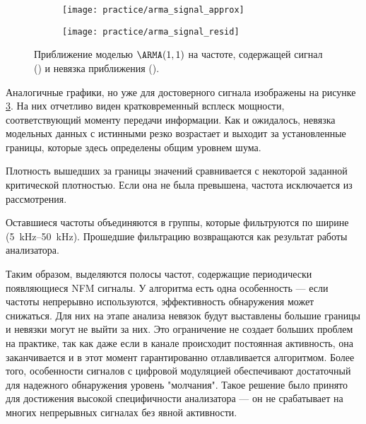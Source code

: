\begin{figure}[h]
  \centering
  \begin{subfigure}{0.45\textwidth}
    \texttt{[image: practice/arma\_signal\_approx]}
    \caption{}
    \label{fig:practice:arma_signal_approx}
  \end{subfigure}
  \begin{subfigure}{0.45\textwidth}
    \texttt{[image: practice/arma\_signal\_resid]}
    \caption{}
    \label{fig:practice:arma_signal_resid}
  \end{subfigure}
  \caption{Приближение моделью $\ARMA(1,1)$ на частоте, содержащей сигнал () и невязка приближения ().}
  \label{fig:practice:arma_signal}
\end{figure}

Аналогичные графики, но уже для достоверного сигнала изображены на рисунке \ref{fig:practice:arma_signal}. На них отчетливо виден кратковременный всплеск мощности, соответствующий моменту передачи информации. Как и ожидалось, невязка модельных данных с истинными резко возрастает и выходит за установленные границы, которые здесь определены общим уровнем шума.

Плотность вышедших за границы значений сравнивается с некоторой заданной критической плотностью. Если она не была превышена, частота исключается из рассмотрения.

Оставшиеся частоты объединяются в группы, которые фильтруются по ширине (\SIrange{5}{50}{\kilo\hertz}). Прошедшие фильтрацию возвращаются как результат работы анализатора.

Таким образом, выделяются полосы частот, содержащие периодически появляющиеся NFM сигналы. У алгоритма есть одна особенность --- если частоты непрерывно используются, эффективность обнаружения может снижаться. Для них на этапе анализа невязок будут выставлены большие границы и невязки могут не выйти за них. Это ограничение не создает больших проблем на практике, так как даже если в канале происходит постоянная активность, она заканчивается и в этот момент гарантированно отлавливается алгоритмом. Более того, особенности сигналов с цифровой модуляцией обеспечивают достаточный для надежного обнаружения уровень "молчания". Такое решение было принято для достижения высокой специфичности анализатора --- он не срабатывает на многих непрерывных сигналах без явной активности.
